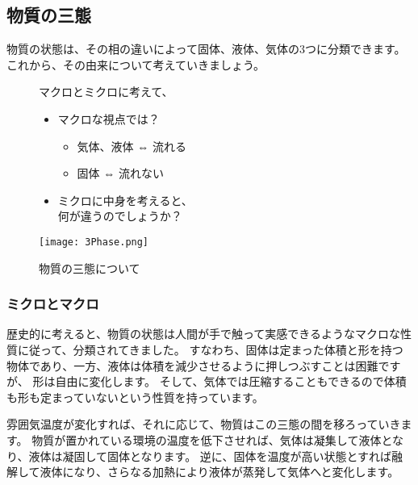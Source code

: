 \documentclass[uplatex,dvipdfmx,a4paper,11pt]{jsarticle}
\begin{document}
\subsection{物質の三態}
物質の状態は、その相の違いによって固体、液体、気体の3つに分類できます。
これから、その由来について考えていきましょう。
\begin{figure}[htb]
	\begin{center}
		\begin{minipage}{0.4\textwidth}
			\large
			\begin{itembox}[l]{マクロとミクロに考えて、}
				\begin{itemize}
					\item マクロな視点では？
					\begin{itemize}
						\item 気体、液体 ⇔ 流れる
						\item 固体 ⇔ 流れない
					\end{itemize}
					\item ミクロに中身を考えると、\\何が違うのでしょうか？
				\end{itemize}
			\end{itembox}
		\end{minipage}
		\begin{minipage}{0.5\textwidth}
			\begin{center}
			\texttt{[image: 3Phase.png]}
			\end{center}
		\end{minipage}
		\caption{物質の三態について}
		\label{fig:santai}
	\end{center}
\end{figure}

\subsubsection{ミクロとマクロ}
歴史的に考えると、物質の状態は人間が手で触って実感できるようなマクロな性質に従って、分類されてきました。
すなわち、固体は定まった体積と形を持つ物体であり、一方、液体は体積を減少させるように押しつぶすことは困難ですが、
形は自由に変化します。
そして、気体では圧縮することもできるので体積も形も定まっていないという性質を持っています。

雰囲気温度が変化すれば、それに応じて、物質はこの三態の間を移ろっていきます。
物質が置かれている環境の温度を低下させれば、気体は凝集して液体となり、液体は凝固して固体となります。
逆に、固体を温度が高い状態とすれば融解して液体になり、さらなる加熱により液体が蒸発して気体へと変化します。
\end{document}
